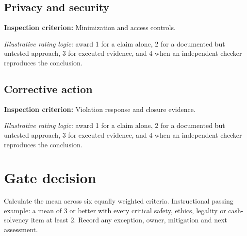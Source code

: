 \documentclass[11pt]{article}
\begin{document}
\subsection*{Privacy and security}
\textbf{Inspection criterion:} Minimization and access controls.\par\textit{Illustrative rating logic:} award 1 for a claim alone, 2 for a documented but untested approach, 3 for executed evidence, and 4 when an independent checker reproduces the conclusion.\par
\subsection*{Corrective action}
\textbf{Inspection criterion:} Violation response and closure evidence.\par\textit{Illustrative rating logic:} award 1 for a claim alone, 2 for a documented but untested approach, 3 for executed evidence, and 4 when an independent checker reproduces the conclusion.\par
\section{Gate decision}
Calculate the mean across six equally weighted criteria. Instructional passing example: a mean of 3 or better with every critical safety, ethics, legality or cash-solvency item at least 2. Record any exception, owner, mitigation and next assessment.
\end{document}
